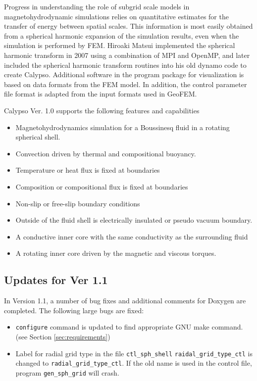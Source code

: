 Progress in understanding the role of subgrid scale models in magnetohydrodynamic simulations relies on quantitative estimates for the transfer of energy between spatial scales. This information is most easily obtained from a spherical harmonic expansion of the simulation results, even when the simulation is performed by FEM. Hiroaki Matsui implemented the spherical harmonic transform in 2007 using a combination of MPI and OpenMP, and later included the spherical harmonic transform routines into his old dynamo code to create Calypso. Additional software in the program package for visualization is based on data formats from the FEM model. In addition, the control parameter file format is adapted from the input formats used in GeoFEM.

Calypso Ver. 1.0 supports the following features and capabilities
%
\begin{itemize}
\item Magnetohydrodynamics simulation for a Boussinesq fluid in a rotating spherical shell.
\item Convection driven by thermal and compositional buoyancy.
\item Temperature or heat flux is fixed at boundaries
\item Composition or compositional flux is fixed at boundaries
\item Non-slip or free-slip boundary conditions
\item Outside of the fluid shell is electrically insulated or pseudo vacuum boundary.
\item A conductive inner core with the same conductivity as the surrounding fluid
\item A rotating inner core driven by the magnetic and viscous torques.
\end{itemize}
%
%
\subsection{Updates for Ver 1.1}
In Version 1.1, a number of bug fixes and additional comments for Doxygen are completed. The following large bugs are fixed:
%
\begin{itemize}
\item \verb|configure| command is updated to find appropriate GNU make command. (see Section \ref{sec:requirements})
\item Label for radial grid type in the file \verb|ctl_sph_shell| \verb|raidal_grid_type_ctl| is changed to \verb|radial_grid_type_ctl|. If the old name is used in the control file, program \verb|gen_sph_grid| will crash.
\end{itemize}
%

